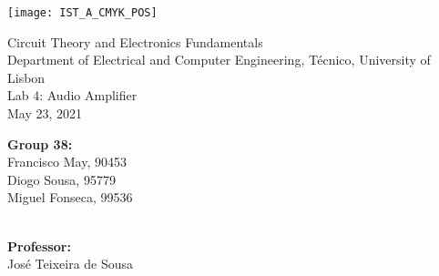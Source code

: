 
\thispagestyle {empty}

\texttt{[image: IST\_A\_CMYK\_POS]}

\begin{center}
%
\vspace{1.0cm}

\vspace{1cm}
{\FontLb Circuit Theory and Electronics Fundamentals} \\ %
\vspace{1cm}
{\FontSn Department of Electrical and Computer Engineering, Técnico, University of Lisbon} \\ %
\vspace{1cm}
{\FontSn Lab 4: Audio Amplifier} \\
\vspace{1cm}
{\FontSn  May 23, 2021} \\ %


        \begin{center}
            \normalsize
            {\textbf{Group 38:}
            \\
             Francisco May, 90453\\
             Diogo Sousa, 95779\\
             Miguel Fonseca, 99536\\
            }
		\end{center}
		
		
        \begin{center}
            \normalsize
            {\textbf{
            \\
             Professor:\\
            }
             José Teixeira de Sousa}
		\end{center}
        \vspace{10pt}

%
\end{center}

